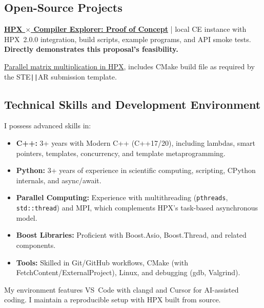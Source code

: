 \documentclass[11pt, a4paper]{article}
\newcommand{\code}[1]{\texttt{#1}}
\begin{document}
\subsection*{Open-Source Projects}

\href{https://github.com/GitMasterJatin/Integrating-HPX-with-Compiler-Explorer-}%
{\textbf{HPX $\times$ Compiler Explorer: Proof of Concept}} | local CE
instance with HPX~2.0.0 integration, build scripts, example programs, and
API smoke tests. \textbf{Directly demonstrates this proposal's feasibility.}

\href{https://github.com/GitMasterJatin/Parallel-matrix-multiplication-implemented-in-HPX}%
{Parallel matrix multiplication in HPX}, includes CMake build file as
required by the STE\texttt{||}AR submission template.

\subsection*{Technical Skills and Development Environment}

I possess advanced skills in:
\begin{itemize}[leftmargin=2em, itemsep=4pt]
  \item \textbf{C++:} 3+ years with Modern C++ (C++17/20), including lambdas,
        smart pointers, templates, concurrency, and template metaprogramming.

  \item \textbf{Python:} 3+ years of experience in scientific computing,
        scripting, CPython internals, and async/await.

  \item \textbf{Parallel Computing:} Experience with multithreading
        (\code{pthreads}, \code{std::thread}) and MPI, which complements
        HPX's task-based asynchronous model.

  \item \textbf{Boost Libraries:} Proficient with Boost.Asio, Boost.Thread,
        and related components.

  \item \textbf{Tools:} Skilled in Git/GitHub workflows, CMake (with
        FetchContent/ExternalProject), Linux, and debugging (gdb, Valgrind).
\end{itemize}

My environment features VS~Code with clangd and Cursor for AI-assisted
coding.  I maintain a reproducible setup with HPX built from source.

\end{document}
